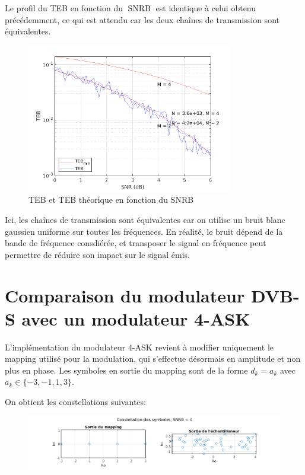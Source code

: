 \documentclass[a4paper, 12pt]{article}
\begin{document}
\clearpage
Le profil du TEB en fonction du $\operatorname{SNRB}$ est identique à celui
obtenu précédemment, ce qui est attendu car les deux chaînes de transmission
sont équivalentes. \medbreak

\begin{figure}[H]
    \centering
    \includegraphics[width=0.8\textwidth]{graphics/2-5.png}
    \caption{TEB et TEB théorique en fonction du SNRB}
    \label{fig:teb_snrb_dvbs2}
\end{figure}

Ici, les chaînes de transmission sont équivalentes car on utilise un bruit blanc
gaussien uniforme sur toutes les fréquences. En réalité, le bruit dépend de la
bande de fréquence consdiérée, et transposer le signal en fréquence peut
permettre de réduire son impact sur le signal émis. \medbreak


\clearpage
\section{Comparaison du modulateur DVB-S avec un modulateur 4-ASK}

L'implémentation du modulateur 4-ASK revient à modifier uniquement le mapping
utilisé pour la modulation, qui s'effectue désormais en amplitude et non plus en
phase. Les symboles en sortie du mapping sont de la forme $d_k = a_k$ avec
$a_k \in \{-3, -1, 1, 3\}$. \medbreak

On obtient les constellations suivantes:

\begin{figure}[H]
    \centering
    \includegraphics[trim=60 0 60 0, clip, width=\textwidth]{graphics/3-1_4.png}
    \label{fig:constellation_ask}
\end{figure}
\end{document}
